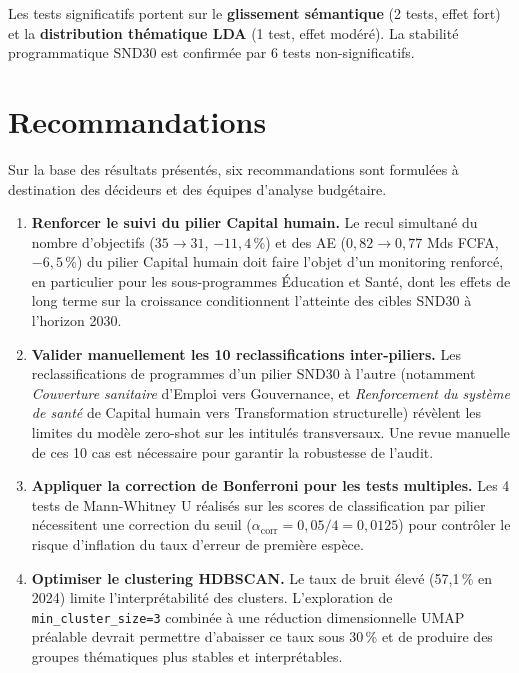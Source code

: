 \documentclass[12pt, a4paper]{article}
\begin{document}
Les tests significatifs portent sur le \textbf{glissement sémantique} (2 tests, effet fort) et la 
\textbf{distribution thématique LDA} (1 test, effet modéré). La stabilité programmatique SND30 est 
confirmée par 6 tests non-significatifs.

\section{Recommandations}

Sur la base des résultats présentés, six recommandations sont formulées à destination des décideurs 
et des équipes d'analyse budgétaire.

\begin{enumerate}[label=\textbf{R\arabic*.}, leftmargin=2cm, itemsep=6pt]

  \item \textbf{Renforcer le suivi du pilier Capital humain.}
  Le recul simultané du nombre d'objectifs ($35 \to 31$, $-11{,}4\,\%$) et des AE ($0{,}82 \to 0{,}77$ 
  Mds FCFA, $-6{,}5\,\%$) du pilier Capital humain doit faire l'objet d'un monitoring renforcé, en 
  particulier pour les sous-programmes Éducation et Santé, dont les effets de long terme sur la 
  croissance conditionnent l'atteinte des cibles SND30 à l'horizon 2030.

  \item \textbf{Valider manuellement les 10 reclassifications inter-piliers.}
  Les reclassifications de programmes d'un pilier SND30 à l'autre (notamment \textit{Couverture 
  sanitaire} d'Emploi vers Gouvernance, et \textit{Renforcement du système de santé} de Capital humain 
  vers Transformation structurelle) révèlent les limites du modèle zero-shot sur les intitulés 
  transversaux. Une revue manuelle de ces 10 cas est nécessaire pour garantir la robustesse de l'audit.

  \item \textbf{Appliquer la correction de Bonferroni pour les tests multiples.}
  Les 4 tests de Mann-Whitney U réalisés sur les scores de classification par pilier nécessitent 
  une correction du seuil ($\alpha_{\text{corr}} = 0{,}05/4 = 0{,}0125$) pour contrôler le risque 
  d'inflation du taux d'erreur de première espèce.

  \item \textbf{Optimiser le clustering HDBSCAN.}
  Le taux de bruit élevé (57,1\,\% en 2024) limite l'interprétabilité des clusters. L'exploration 
  de \texttt{min\_cluster\_size=3} combinée à une réduction dimensionnelle UMAP préalable devrait 
  permettre d'abaisser ce taux sous 30\,\% et de produire des groupes thématiques plus stables et 
  interprétables.


\end{enumerate}
\end{document}
